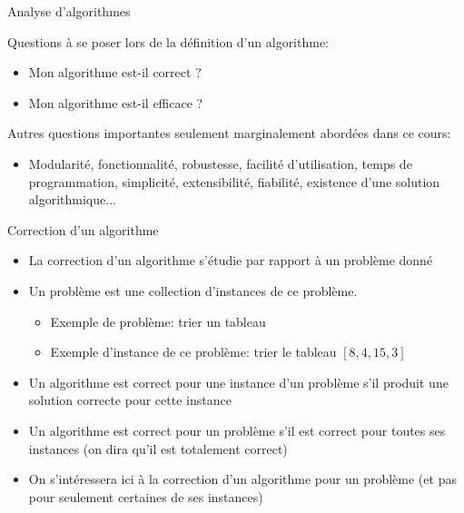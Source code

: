 \begin{frame}{Analyse d'algorithmes}

Questions à se poser lors de la définition d'un algorithme:
\begin{itemize}
\item Mon algorithme est-il correct ?
\item Mon algorithme est-il efficace ? %
\end{itemize}

\bigskip

Autres questions importantes seulement marginalement abordées dans ce cours:
\begin{itemize}
\item Modularité, fonctionnalité, robustesse, facilité d'utilisation, temps
  de programmation, simplicité, extensibilité, fiabilité,
  existence d'une solution algorithmique...
\end{itemize}

\end{frame}

\begin{frame}{Correction d'un algorithme}%

\begin{itemize}
\item La correction d'un algorithme s'étudie par rapport à un problème donné
\item Un problème est une collection d'instances de ce problème.
\begin{itemize}
\item Exemple de problème: trier un tableau
\item Exemple d'instance de ce problème: trier le tableau $[8,4,15,3]$
\end{itemize}
\item Un algorithme est correct pour une instance d'un problème s'il
  produit une solution correcte pour cette instance
\item Un algorithme est correct pour un problème s'il est correct pour
  toutes ses instances (on dira qu'il est totalement correct)
\item On s'intéressera ici à la correction d'un algorithme pour un
  problème (et pas pour seulement certaines de ses instances)
\end{itemize}

\note{}

\end{frame}

